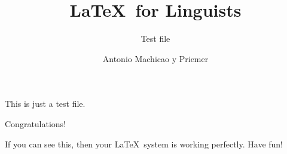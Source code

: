 \documentclass[10pt,paper=a4,abstracton]{scrartcl}
\author{Antonio Machicao y Priemer}
\title{\LaTeX\ for Linguists}
\subtitle{Test file}
\begin{document}
\maketitle

This is just a test file. 

\blindtext


\vspace{2cm}
{\Huge Congratulations!}

\vspace{.5cm}

If you can see this, then your \LaTeX\ system is working perfectly. Have fun!
\end{document}
